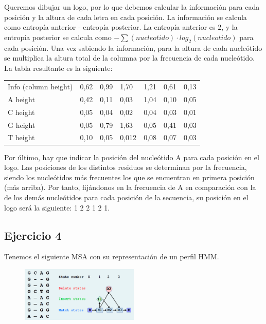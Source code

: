 Queremos dibujar un logo, por lo que debemos calcular la información para cada posición y la altura de cada letra en cada posición. La información se calcula como entropía anterior - entropía posterior. La entropía anterior es 2, y la entropía posterior se calcula como $- \sum (nucleotido) \cdot log_2 (nucleotido)$ para cada posición. Una vez sabiendo la información, para la altura de cada nucleótido se multiplica la altura total de la columna por la frecuencia de cada nucleótido. La tabla resultante es la siguiente:
\begin{table}[htbp]
\centering
\begin{tabular}{l | llllll}
Info (column height) & 0,62 & 0,99 & 1,70 & 1,21 & 0,61 & 0,13 \\
A height & 0,42 & 0,11 & 0,03 & 1,04 & 0,10 & 0,05 \\
C height & 0,05 & 0,04 & 0,02 & 0,04 & 0,03 & 0,01 \\
G height & 0,05 & 0,79 & 1,63  & 0,05 & 0,41 & 0,03 \\
T height & 0,10  & 0,05 & 0,012 & 0,08 & 0,07 & 0,03
\end{tabular}
\end{table}

Por último, hay que indicar la posición del nucleótido A para cada posición en el logo. Las posiciones de los distintos residuos se determinan por la frecuencia, siendo los nucleótidos más frecuentes los que se encuentran en primera posición (más arriba). Por tanto, fijándonos en la frecuencia de A en comparación con la de los demás nucleótidos para cada posición de la secuencia, su posición en el logo será la siguiente: 1 2 2 1 2 1.

\subsection{Ejercicio 4}
Tenemos el siguiente MSA con su representación de un perfil HMM.
\begin{figure}[htbp]
\centering
\includegraphics[width = 0.5\textwidth]{figs/moodle-msa-ej4.png}
\end{figure}

